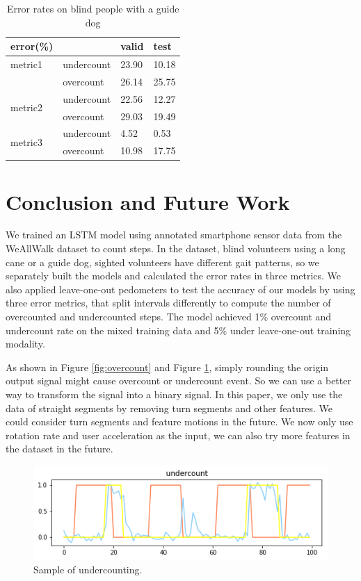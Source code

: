 \documentclass[11pt]{article}
\begin{document}
{\begin{table}[]
\centering
\caption{Error rates on blind people with a guide dog}
\label{my-label}
\begin{tabular}{llll}
\hline
error(\%)                &            & valid & test  \\ \hline
metric1                  & undercount & 23.90 & 10.18 \\
                         & overcount  & 26.14 & 25.75 \\ \hline
\multirow{2}{*}{metric2} & undercount & 22.56 & 12.27 \\
                         & overcount  & 29.03 & 19.49 \\ \hline
\multirow{2}{*}{metric3} & undercount & 4.52  & 0.53  \\
                         & overcount  & 10.98 & 17.75 \\ \hline
\end{tabular}
\end{table}


\section{Conclusion and Future Work}

We trained an LSTM model using annotated smartphone sensor data from the WeAllWalk dataset to count steps. In the dataset, blind volunteers using a long cane or a guide dog, sighted volunteers have different gait patterns, so we separately built the models and calculated the error rates in three metrics. We also applied leave-one-out pedometers to test the accuracy of our models by using three error metrics, that split intervals differently to compute the number of overcounted and undercounted steps. The model achieved 1\% overcount and undercount rate on the mixed training data and 5\% under leave-one-out training modality.

As shown in Figure \ref{fig:overcount} and Figure \ref{fig:undercount}, simply rounding the origin output signal might cause overcount or undercount event. So we can use a better way to transform the signal into a binary signal. In this paper, we only use the data of straight segments by removing turn segments and other features. We could consider turn segments and feature motions in the future. We now only use rotation rate and user acceleration as the input, we can also try more features in the dataset in the future.

\begin{figure}[ht]
\centering
\includegraphics[scale=0.4]{undercount}
\caption{Sample of undercounting.}
\label{fig:undercount}
\end{figure}

}
\end{document}
